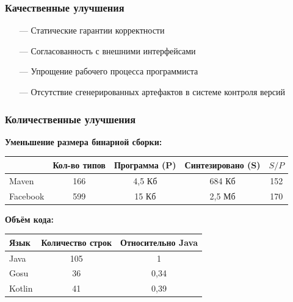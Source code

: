\documentclass[12pt]{beamer}
\begin{document}
\begin{frame}\frametitle{Качественные улучшения}
\linespread{1.1}
\begin{Large}
    \begin{itemize}
        \item[---] Статические гарантии корректности
        \item[---] Согласованность с внешними интерфейсами
        \item[---] Упрощение рабочего процесса программиста
        \item[---] Отсутствие сгенерированных артефактов в системе контроля версий
    \end{itemize}
\end{Large}
\linespread{1}
\end{frame}

\begin{frame}\frametitle{Количественные улучшения}
\begin{footnotesize}
\textbf{Уменьшение размера бинарной сборки:}
\begin{table}[!h]
    \begin{tabular}{ | l | c | c | c | c | }
    \hline
               & Кол-во типов & Программа (P) & Синтезировано (S) & $S/P$ \\ \hline
    Maven      & 166   & 4,5 Кб  & 684 Кб & 152 \\ \hline
    Facebook   & 599   & 15 Кб  & 2,5 Мб & 170 \\ \hline
    \end{tabular}
\end{table}


\textbf{Объём кода:}
\begin{table}[!h]
    \begin{tabular}{ | l | c | c | }
    \hline
    Язык    & Количество строк & Относительно Java \\ \hline
    Java    & 105   & 1 \\ \hline
    Gosu    & 36    & 0,34  \\ \hline
    Kotlin  & 41    & 0,39 \\
    \hline
    \end{tabular}
\end{table}

\end{footnotesize}
\end{frame}
\end{document}

